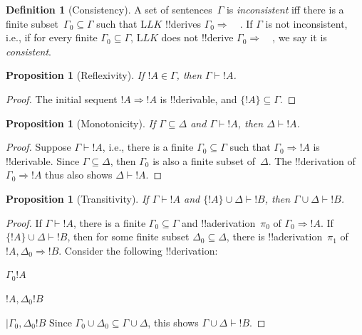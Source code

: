 \documentclass[10pt,a4paper]{article}
\theoremstyle{plain}
\newtheorem{prop}[thm]{Proposition}
\theoremstyle{definition}
\newtheorem{defn}[thm]{Definition}
\theoremstyle{remark}
\newcommand*{\ollabel}[1]{\label{#1}}
\providecommand{\AxiomC}[1]{}
\providecommand{\RightLabel}[1]{}
\providecommand{\fCenter}{}
\newenvironment{prooftree}{}{}
\providecommand{\Sequent}{\mathrel{\Rightarrow}}
\providecommand{\Proves}{\mathrel{\vdash}}
\providecommand{\Log}{\ensuremath{\mathrm{L}}}
\providecommand{\Deduce}{\mathrm{D}}
\providecommand{\BinaryInf}{\ensuremath{\mid}}
\providecommand{\Cut}{\mathrm{Cut}}
\begin{document}
\begin{defn}[Consistency]
A set of sentences~$\Gamma$ is \emph{inconsistent} iff there is a
finite subset~$\Gamma_0 \subseteq \Gamma$ such that $\Log{LK}$
!!{derive}s $\Gamma_0 \Sequent \quad$. If $\Gamma$ is not
inconsistent, i.e., if for every finite $\Gamma_0 \subseteq \Gamma$,
$\Log{LK}$ does not !!{derive} $\Gamma_0 \Sequent \quad$, we say it is
\emph{consistent}.
\end{defn}

\begin{prop}[Reflexivity]
\ollabel{prop:reflexivity}
If $!A \in \Gamma$, then $\Gamma \Proves !A$.
\end{prop}

\begin{proof}
The initial sequent $!A \Sequent !A$ is !!{derivable}, and $\{!A\}
\subseteq \Gamma$.
\end{proof}
  
\begin{prop}[Monotonicity]
\ollabel{prop:monotonicity}
If $\Gamma \subseteq \Delta$ and $\Gamma \Proves !A$, then $\Delta
\Proves !A$.
\end{prop}

\begin{proof}
Suppose $\Gamma \Proves !A$, i.e., there is a finite $\Gamma_0
\subseteq \Gamma$ such that $\Gamma_0 \Sequent !A$ is
!!{derivable}. Since $\Gamma \subseteq \Delta$, then $\Gamma_0$ is
also a finite subset of~$\Delta$. The !!{derivation} of $\Gamma_0
\Sequent !A$ thus also shows $\Delta \Proves !A$.
\end{proof}

\begin{prop}[Transitivity]
\ollabel{prop:transitivity}
If $\Gamma \Proves !A$ and $\{!A\} \cup \Delta \Proves
!B$, then $\Gamma \cup \Delta \Proves !B$.
\end{prop}

\begin{proof}
If $\Gamma \Proves !A$, there is a finite $\Gamma_0 \subseteq \Gamma$
and !!a{derivation}~$\pi_0$ of $\Gamma_0 \Sequent !A$.  If $\{!A\}
\cup \Delta \Proves !B$, then for some finite subset $\Delta_0
\subseteq \Delta$, there is !!a{derivation}~$\pi_1$ of $!A, \Delta_0
\Sequent !B$. Consider the following !!{derivation}:
\begin{prooftree}
  \AxiomC{}
  \RightLabel{$\pi_0$}
  \Deduce$\Gamma_0 \fCenter !A$
  \AxiomC{}
  \RightLabel{$\pi_1$}
  \Deduce$!A, \Delta_0 \fCenter !B$
  \RightLabel{\Cut}
  \BinaryInf$\Gamma_0, \Delta_0 \fCenter !B$
\end{prooftree}
Since $\Gamma_0 \cup \Delta_0 \subseteq \Gamma \cup \Delta$, this
shows $\Gamma \cup \Delta \Proves !B$.
\end{proof}
\end{document}
